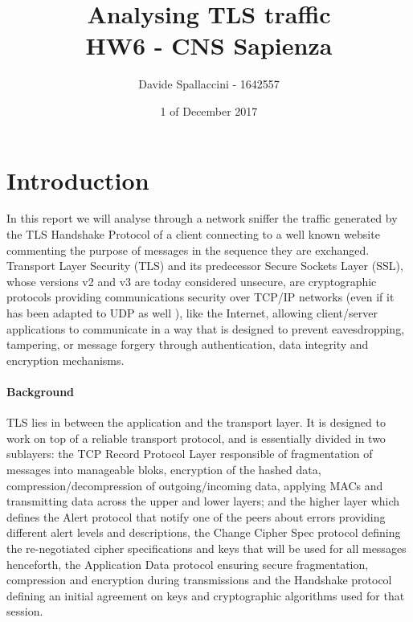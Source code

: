 \documentclass[11pt]{article}
\begin{document}
\title{Analysing TLS traffic\\ HW6 - CNS Sapienza}
\author{Davide Spallaccini - 1642557}
\date{1 of December 2017}
\maketitle


\section{Introduction}
In this report we will analyse through a network sniffer the traffic generated by the TLS Handshake Protocol of a client connecting to a well known website commenting the purpose of messages in the sequence they are exchanged. Transport Layer Security (TLS) and its predecessor Secure Sockets Layer (SSL), whose versions v2 and v3 are today considered unsecure, are cryptographic protocols providing communications security over TCP/IP networks (even if it has been adapted to UDP as well \cite{RFC6347}), like the Internet, allowing client/server applications to communicate in a way that is designed to prevent eavesdropping, tampering, or message forgery through authentication, data integrity and encryption mechanisms.

\paragraph*{Background}
TLS lies in between the application and the transport layer. It is designed to work on top of a reliable transport protocol, and is essentially divided in two sublayers: the TCP Record Protocol Layer responsible of fragmentation of messages into manageable bloks, encryption of the hashed data, compression/decompression of outgoing/incoming data, applying MACs and transmitting data across the upper and lower layers; and the higher layer which defines the Alert protocol that notify one of the peers about errors providing different alert levels and descriptions, the Change Cipher Spec protocol defining the re-negotiated cipher specifications and keys that will be used for all messages henceforth, the Application Data protocol ensuring secure fragmentation, compression and encryption during transmissions and the Handshake protocol defining an initial agreement on keys and cryptographic algorithms used for that session.
\end{document}
